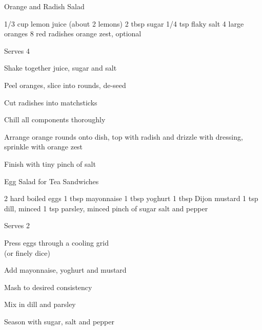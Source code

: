 \begin{recipe}{Orange and Radish Salad}{}
\begin{ingredients}
1/3 cup lemon juice (about 2 lemons)
2 tbsp sugar
1/4 tsp flaky salt
4 large oranges
8 red radishes
orange zest, optional
\end{ingredients}
\nextcolumn
Serves 4
\begin{steps}
    \item Shake together juice, sugar and salt
    \item Peel oranges, slice into rounds, de-seed
    \item Cut radishes into matchsticks
    \item Chill all components thoroughly
    \item Arrange orange rounds onto dish, top with radish and drizzle with dressing, sprinkle with orange zest
    \item Finish with tiny pinch of salt
\end{steps}
\end{recipe}

\begin{recipe}{Egg Salad for Tea Sandwiches}{}
\begin{ingredients}
2 hard boiled eggs
1 tbsp mayonnaise
1 tbsp yoghurt
1 tbsp Dijon mustard
1 tsp dill, minced
1 tsp parsley, minced
pinch of sugar
salt and pepper
\end{ingredients}
\nextcolumn
Serves 2
\begin{steps}
    \item Press eggs through a cooling grid \\(or finely dice)
    \item Add mayonnaise, yoghurt and mustard
    \item Mash to desired consistency
    \item Mix in dill and parsley
    \item Season with sugar, salt and pepper
\end{steps}
\end{recipe}

